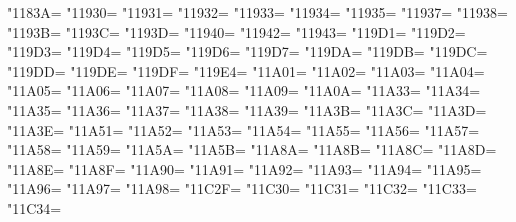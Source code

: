 \XeTeXcharclass"1183A=\KclassCM
\XeTeXcharclass"11930=\KclassCM
\XeTeXcharclass"11931=\KclassCM
\XeTeXcharclass"11932=\KclassCM
\XeTeXcharclass"11933=\KclassCM
\XeTeXcharclass"11934=\KclassCM
\XeTeXcharclass"11935=\KclassCM
\XeTeXcharclass"11937=\KclassCM
\XeTeXcharclass"11938=\KclassCM
\XeTeXcharclass"1193B=\KclassCM
\XeTeXcharclass"1193C=\KclassCM
\XeTeXcharclass"1193D=\KclassCM
\XeTeXcharclass"11940=\KclassCM
\XeTeXcharclass"11942=\KclassCM
\XeTeXcharclass"11943=\KclassCM
\XeTeXcharclass"119D1=\KclassCM
\XeTeXcharclass"119D2=\KclassCM
\XeTeXcharclass"119D3=\KclassCM
\XeTeXcharclass"119D4=\KclassCM
\XeTeXcharclass"119D5=\KclassCM
\XeTeXcharclass"119D6=\KclassCM
\XeTeXcharclass"119D7=\KclassCM
\XeTeXcharclass"119DA=\KclassCM
\XeTeXcharclass"119DB=\KclassCM
\XeTeXcharclass"119DC=\KclassCM
\XeTeXcharclass"119DD=\KclassCM
\XeTeXcharclass"119DE=\KclassCM
\XeTeXcharclass"119DF=\KclassCM
\XeTeXcharclass"119E4=\KclassCM
\XeTeXcharclass"11A01=\KclassCM
\XeTeXcharclass"11A02=\KclassCM
\XeTeXcharclass"11A03=\KclassCM
\XeTeXcharclass"11A04=\KclassCM
\XeTeXcharclass"11A05=\KclassCM
\XeTeXcharclass"11A06=\KclassCM
\XeTeXcharclass"11A07=\KclassCM
\XeTeXcharclass"11A08=\KclassCM
\XeTeXcharclass"11A09=\KclassCM
\XeTeXcharclass"11A0A=\KclassCM
\XeTeXcharclass"11A33=\KclassCM
\XeTeXcharclass"11A34=\KclassCM
\XeTeXcharclass"11A35=\KclassCM
\XeTeXcharclass"11A36=\KclassCM
\XeTeXcharclass"11A37=\KclassCM
\XeTeXcharclass"11A38=\KclassCM
\XeTeXcharclass"11A39=\KclassCM
\XeTeXcharclass"11A3B=\KclassCM
\XeTeXcharclass"11A3C=\KclassCM
\XeTeXcharclass"11A3D=\KclassCM
\XeTeXcharclass"11A3E=\KclassCM
\XeTeXcharclass"11A51=\KclassCM
\XeTeXcharclass"11A52=\KclassCM
\XeTeXcharclass"11A53=\KclassCM
\XeTeXcharclass"11A54=\KclassCM
\XeTeXcharclass"11A55=\KclassCM
\XeTeXcharclass"11A56=\KclassCM
\XeTeXcharclass"11A57=\KclassCM
\XeTeXcharclass"11A58=\KclassCM
\XeTeXcharclass"11A59=\KclassCM
\XeTeXcharclass"11A5A=\KclassCM
\XeTeXcharclass"11A5B=\KclassCM
\XeTeXcharclass"11A8A=\KclassCM
\XeTeXcharclass"11A8B=\KclassCM
\XeTeXcharclass"11A8C=\KclassCM
\XeTeXcharclass"11A8D=\KclassCM
\XeTeXcharclass"11A8E=\KclassCM
\XeTeXcharclass"11A8F=\KclassCM
\XeTeXcharclass"11A90=\KclassCM
\XeTeXcharclass"11A91=\KclassCM
\XeTeXcharclass"11A92=\KclassCM
\XeTeXcharclass"11A93=\KclassCM
\XeTeXcharclass"11A94=\KclassCM
\XeTeXcharclass"11A95=\KclassCM
\XeTeXcharclass"11A96=\KclassCM
\XeTeXcharclass"11A97=\KclassCM
\XeTeXcharclass"11A98=\KclassCM
\XeTeXcharclass"11C2F=\KclassCM
\XeTeXcharclass"11C30=\KclassCM
\XeTeXcharclass"11C31=\KclassCM
\XeTeXcharclass"11C32=\KclassCM
\XeTeXcharclass"11C33=\KclassCM
\XeTeXcharclass"11C34=\KclassCM
